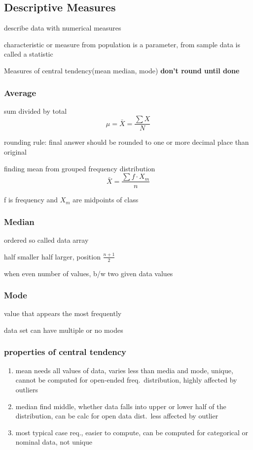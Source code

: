 \documentclass[11pt]{article}
\begin{document}
\subsection{Descriptive Measures}
\par describe data with numerical measures
\par characteristic or measure from population is a parameter, from sample
data is called a statistic
\par Measures of central tendency(mean median, mode)
\textbf{don't round until done}
\subsubsection{Average}
\par sum divided by total
\begin{equation*}
  \mu = \bar{X} = \frac{\sum{X}}{N}
\end{equation*}
\par rounding rule: final answer should be rounded to one or more decimal
place than original
\par finding mean from grouped frequency distribution
\begin{equation}
  \bar{X} = \frac{\sum{f \cdot X_m}}{n}
\end{equation}
\par f is frequency and $X_m$ are midpoints of class
\subsubsection{Median}
\par ordered so called data array
\par half smaller half larger, position $\frac{n+1}{2}$
\par when even number of values, b/w two given data values
\subsubsection{Mode}
\par value that appears the most frequently
\par data set can have multiple or no modes
\subsubsection{properties of central tendency}
\begin{enumerate}
  \item mean needs all values of data, varies less than media and mode, unique,
    cannot be computed for open-ended freq.\ distribution, highly affected by outliers
  \item median find middle, whether data falls into upper or lower half of the
    distribution, can be calc for open data dist.\ less affected by outlier
  \item most typical case req., easier to compute, can be computed for categorical or nominal data, not unique
\end{enumerate}
\end{document}

